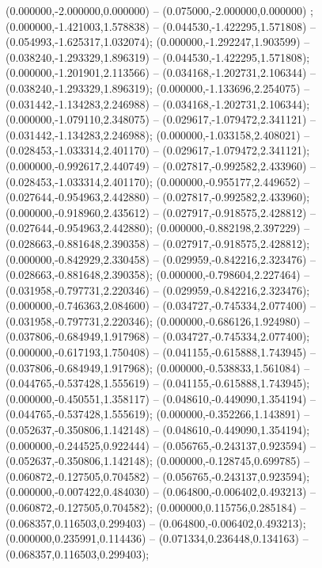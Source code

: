  (0.000000,-2.000000,0.000000) -- (0.075000,-2.000000,0.000000) ;
 (0.000000,-1.421003,1.578838) -- (0.044530,-1.422295,1.571808) -- (0.054993,-1.625317,1.032074);
 (0.000000,-1.292247,1.903599) -- (0.038240,-1.293329,1.896319) -- (0.044530,-1.422295,1.571808);
 (0.000000,-1.201901,2.113566) -- (0.034168,-1.202731,2.106344) -- (0.038240,-1.293329,1.896319);
 (0.000000,-1.133696,2.254075) -- (0.031442,-1.134283,2.246988) -- (0.034168,-1.202731,2.106344);
 (0.000000,-1.079110,2.348075) -- (0.029617,-1.079472,2.341121) -- (0.031442,-1.134283,2.246988);
 (0.000000,-1.033158,2.408021) -- (0.028453,-1.033314,2.401170) -- (0.029617,-1.079472,2.341121);
 (0.000000,-0.992617,2.440749) -- (0.027817,-0.992582,2.433960) -- (0.028453,-1.033314,2.401170);
 (0.000000,-0.955177,2.449652) -- (0.027644,-0.954963,2.442880) -- (0.027817,-0.992582,2.433960);
 (0.000000,-0.918960,2.435612) -- (0.027917,-0.918575,2.428812) -- (0.027644,-0.954963,2.442880);
 (0.000000,-0.882198,2.397229) -- (0.028663,-0.881648,2.390358) -- (0.027917,-0.918575,2.428812);
 (0.000000,-0.842929,2.330458) -- (0.029959,-0.842216,2.323476) -- (0.028663,-0.881648,2.390358);
 (0.000000,-0.798604,2.227464) -- (0.031958,-0.797731,2.220346) -- (0.029959,-0.842216,2.323476);
 (0.000000,-0.746363,2.084600) -- (0.034727,-0.745334,2.077400) -- (0.031958,-0.797731,2.220346);
 (0.000000,-0.686126,1.924980) -- (0.037806,-0.684949,1.917968) -- (0.034727,-0.745334,2.077400);
 (0.000000,-0.617193,1.750408) -- (0.041155,-0.615888,1.743945) -- (0.037806,-0.684949,1.917968);
 (0.000000,-0.538833,1.561084) -- (0.044765,-0.537428,1.555619) -- (0.041155,-0.615888,1.743945);
 (0.000000,-0.450551,1.358117) -- (0.048610,-0.449090,1.354194) -- (0.044765,-0.537428,1.555619);
 (0.000000,-0.352266,1.143891) -- (0.052637,-0.350806,1.142148) -- (0.048610,-0.449090,1.354194);
 (0.000000,-0.244525,0.922444) -- (0.056765,-0.243137,0.923594) -- (0.052637,-0.350806,1.142148);
 (0.000000,-0.128745,0.699785) -- (0.060872,-0.127505,0.704582) -- (0.056765,-0.243137,0.923594);
 (0.000000,-0.007422,0.484030) -- (0.064800,-0.006402,0.493213) -- (0.060872,-0.127505,0.704582);
 (0.000000,0.115756,0.285184) -- (0.068357,0.116503,0.299403) -- (0.064800,-0.006402,0.493213);
 (0.000000,0.235991,0.114436) -- (0.071334,0.236448,0.134163) -- (0.068357,0.116503,0.299403);
